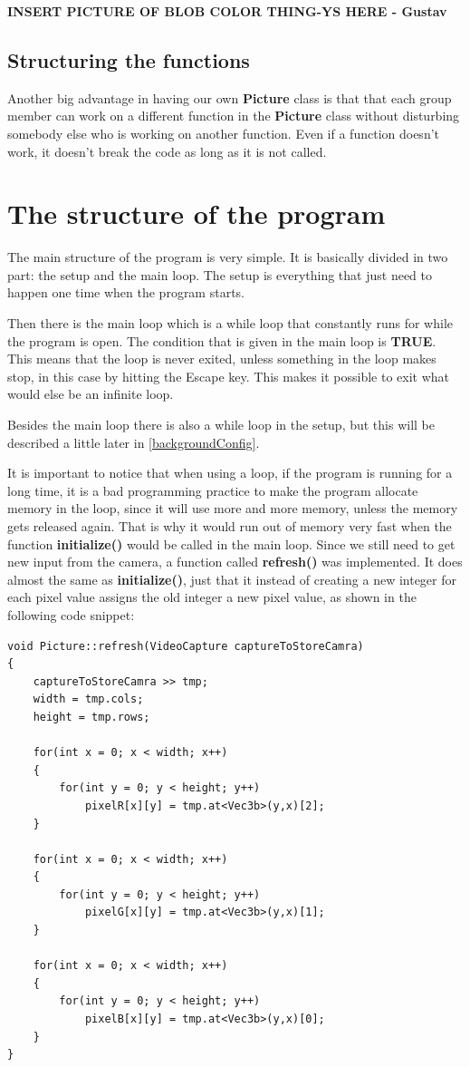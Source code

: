 \textbf{INSERT PICTURE OF BLOB COLOR THING-YS HERE - Gustav} 

\subsection{Structuring the functions}
Another big advantage in having our own \textbf{Picture} class is that that each group member can work on a different function in the \textbf{Picture} class without disturbing somebody else who is working on another function. Even if a function doesn't work, it doesn't break the code as long as it is not called.

\section{The structure of the program}
The main structure of the program is very simple. It is basically divided in two part: the setup and the main loop. The setup is everything that just need to happen one time when the program starts.

Then there is the main loop which is a while loop that constantly runs for while the program is open. The condition that is given in the main loop is \textbf{TRUE}. This means that the loop is never exited, unless something in the loop makes stop, in this case by hitting the Escape key. This makes it possible to exit what would else be an infinite loop.

Besides the main loop there is also a while loop in the setup, but this will be described a little later in \ref{backgroundConfig}.

It is important to notice that when using a loop, if the program is running for a long time, it is a bad programming practice to make the program allocate memory in the loop, since it will use more and more memory, unless the memory gets released again. That is why it would run out of memory very fast when the function \textbf{initialize()} would be called in the main loop. Since we still need to get new input from the camera, a function called \textbf{refresh()} was implemented. It does almost the same as \textbf{initialize()}, just that it instead of creating a new integer for each pixel value assigns the old integer a new pixel value, as shown in the following code snippet:

\begin{lstlisting}
void Picture::refresh(VideoCapture captureToStoreCamra)
{
	captureToStoreCamra >> tmp;
	width = tmp.cols;
	height = tmp.rows;

	for(int x = 0; x < width; x++)
	{
		for(int y = 0; y < height; y++)
			pixelR[x][y] = tmp.at<Vec3b>(y,x)[2];
	}

	for(int x = 0; x < width; x++)
	{
		for(int y = 0; y < height; y++)
			pixelG[x][y] = tmp.at<Vec3b>(y,x)[1];
	}

	for(int x = 0; x < width; x++)
	{
		for(int y = 0; y < height; y++)
			pixelB[x][y] = tmp.at<Vec3b>(y,x)[0];
	}
}
\end{lstlisting}

